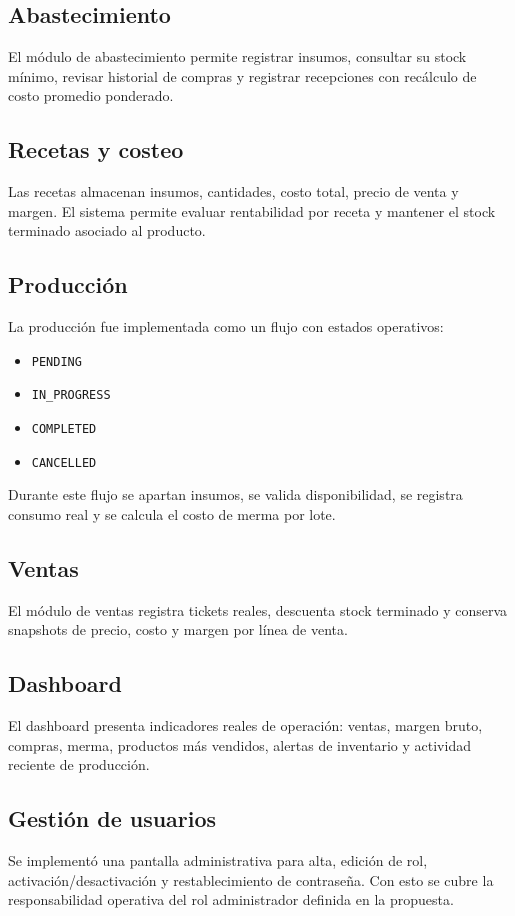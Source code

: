 \documentclass[12pt,letterpaper]{article}
\begin{document}
\subsection{Abastecimiento}
El módulo de abastecimiento permite registrar insumos, consultar su stock mínimo, revisar historial de compras y registrar recepciones con recálculo de costo promedio ponderado.

\subsection{Recetas y costeo}
Las recetas almacenan insumos, cantidades, costo total, precio de venta y margen. El sistema permite evaluar rentabilidad por receta y mantener el stock terminado asociado al producto.

\subsection{Producción}
La producción fue implementada como un flujo con estados operativos:
\begin{itemize}
	\item \texttt{PENDING}
	\item \texttt{IN\_PROGRESS}
	\item \texttt{COMPLETED}
	\item \texttt{CANCELLED}
\end{itemize}

Durante este flujo se apartan insumos, se valida disponibilidad, se registra consumo real y se calcula el costo de merma por lote.

\subsection{Ventas}
El módulo de ventas registra tickets reales, descuenta stock terminado y conserva snapshots de precio, costo y margen por línea de venta.

\subsection{Dashboard}
El dashboard presenta indicadores reales de operación: ventas, margen bruto, compras, merma, productos más vendidos, alertas de inventario y actividad reciente de producción.

\subsection{Gestión de usuarios}
Se implementó una pantalla administrativa para alta, edición de rol, activación/desactivación y restablecimiento de contraseña. Con esto se cubre la responsabilidad operativa del rol administrador definida en la propuesta.
\end{document}
